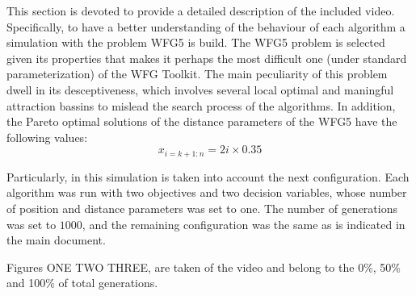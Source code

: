 This section is devoted to provide a detailed description of the included video.
%
Specifically, to have a better understanding of the behaviour of each algorithm a simulation with the problem WFG5 is build.
%
The WFG5 problem is selected given its properties that makes it perhaps the most difficult one (under standard parameterization) of the WFG Toolkit.
%
The main peculiarity of this problem dwell in its desceptiveness, which involves several local optimal and maningful attraction bassins to mislead the search process of the algorithms.
%
In addition, the Pareto optimal solutions of the distance parameters of the WFG5 have the following values:
%
\begin{equation}
   x_{i=k+1:n} = 2i \times 0.35
\end{equation}

Particularly, in this simulation is taken into account the next configuration.
%
Each algorithm was run with two objectives and two decision variables, whose number of position and distance parameters was set to one.
%
The number of generations was set to $1000$, and the remaining configuration was the same as is indicated in the main document.
%

Figures ONE TWO THREE, are taken of the video and belong to the 0\%, 50\% and 100\% of total generations.

